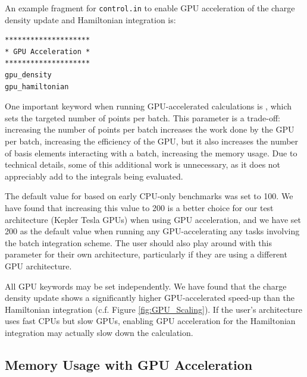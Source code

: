 An example fragment for \texttt{control.in} to enable GPU acceleration of the charge density update and Hamiltonian integration is:
\begin{verbatim}
********************
* GPU Acceleration *
********************
gpu_density
gpu_hamiltonian
\end{verbatim}
	
One important keyword when running GPU-accelerated calculations is , which sets the targeted number of points per batch.  This parameter is a trade-off: increasing the number of points per batch increases the work done by the GPU per batch, increasing the efficiency of the GPU, but it also increases the number of basis elements interacting with a batch, increasing the memory usage.  Due to technical details, some of this additional work is unnecessary, as it does not appreciably add to the integrals being evaluated.

The default value for  based on early CPU-only benchmarks was set to 100.  We have found that increasing this value to 200 is a better choice for our test architecture (Kepler Tesla GPUs) when using GPU acceleration, and we have set 200 as the default value when running any GPU-accelerating any tasks involving the batch integration scheme.  The user should also play around with this parameter for their own architecture, particularly if they are using a different GPU architecture.

All GPU keywords may be set independently.  We have found that the charge density update shows a significantly higher GPU-accelerated speed-up than the Hamiltonian integration (c.f. Figure \ref{fig:GPU_Scaling}).  If the user's architecture uses fast CPUs but slow GPUs, enabling GPU acceleration for the Hamiltonian integration may actually slow down the calculation.

\subsection{Memory Usage with GPU Acceleration}

